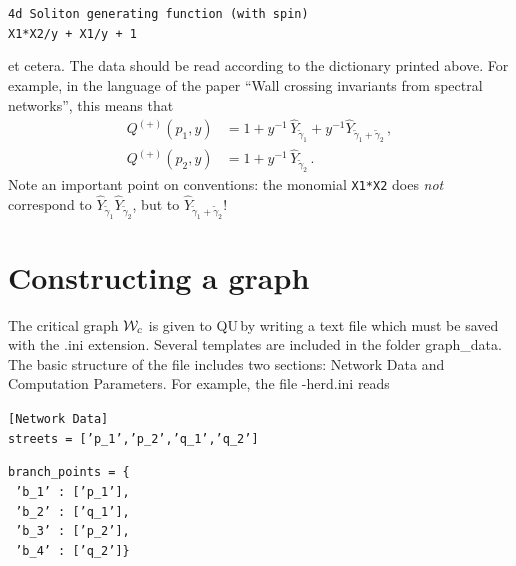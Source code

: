 \documentclass[11pt]{article}
\def\QU{{\sf QU}$\,$}
\begin{document}
\smallskip

\noindent\texttt{4d Soliton generating function (with spin)}\\
\texttt{X1*X2/y + X1/y + 1}

\medskip

et cetera. The data should be read according to the dictionary printed above. For example, in the language of the paper ``Wall crossing invariants from spectral networks'', this means that 
\begin{equation}
\begin{split}
	Q^{(+)}(p_1,y) & = 1+y^{-1} \, {\hat Y}_{\tilde\gamma_1} + y^{-1} {\hat Y}_{\tilde\gamma_1+\tilde\gamma_2} \,,\\
	Q^{(+)}(p_2,y) & = 1+y^{-1} \, {\hat Y}_{\tilde\gamma_2} \,.
\end{split}
\end{equation}
Note an important point on conventions: the monomial {\texttt{X1*X2}} does \emph{not} correspond to ${\hat Y}_{\tilde\gamma_1}{\hat Y}_{\tilde\gamma_2}$, but to ${\hat Y}_{\tilde\gamma_1+\tilde\gamma_2}$! 


\section{Constructing a graph}

The critical graph ${\cal W}_c$ is given to \QU by writing a text file which must be saved with the {\sf .ini} extension.
Several templates are included in the folder {\sf graph\_data}. The basic structure of the file includes two sections: {\sf Network Data} and {\sf Computation Parameters}.
For example, the file {-herd.ini} reads

\medskip

\noindent\texttt{[Network Data]}\\

\noindent\texttt{{streets = ['p\_1','p\_2','q\_1','q\_2']}}

\noindent\texttt{branch\_points = \{}\\
\noindent\texttt{ \hspace*{10pt} 'b\_1' : ['p\_1'],}\\
\noindent\texttt{ \hspace*{10pt} 'b\_2' : ['q\_1'],}\\
\noindent\texttt{ \hspace*{10pt} 'b\_3' : ['p\_2'],}\\
\noindent\texttt{ \hspace*{10pt} 'b\_4' : ['q\_2']\}}\\
\end{document}
